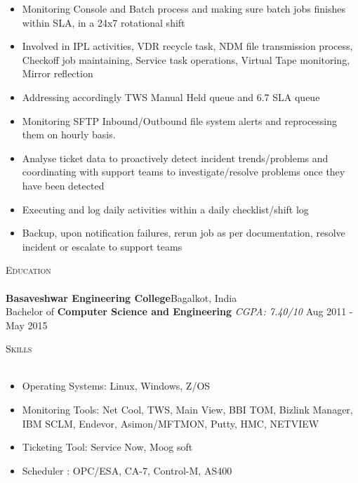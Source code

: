 \documentclass[a4paper]{article}
\newcommand{\lineunder} {
    \vspace*{-8pt} \\
    \hspace*{-18pt} \hrulefill \\
}
\newcommand{\header} [1] {
    {\hspace*{-18pt}\vspace*{6pt} \textsc{#1}}
    \vspace*{-6pt} \lineunder
}
\begin{document}
\justify
\begin{itemize} \itemsep 1pt
          \item Monitoring Console and Batch process and making sure batch jobs finishes within SLA, in a 24x7 rotational shift
	\item Involved in  IPL activities, VDR recycle task, NDM file transmission process, Checkoff job maintaining, Service task operations, Virtual Tape monitoring, Mirror reflection
	\item Addressing accordingly TWS Manual Held queue and 6.7 SLA queue
           \item Monitoring SFTP Inbound/Outbound file system alerts and reprocessing them on hourly basis.
	\item Analyse ticket data to proactively detect incident trends/problems and coordinating with support teams to investigate/resolve problems once they have been detected
	\item Executing and log daily activities within a daily checklist/shift log
           \item Backup, upon notification failures, rerun job as per documentation, resolve incident or escalate to support teams
\end{itemize}

\vspace{2mm}


{\color{blue}\header{Education}}
\vspace{1mm}
\textbf{Basaveshwar Engineering College}\hfill Bagalkot, India\\
Bachelor of \textbf{Computer Science and Engineering} \textit{CGPA: 7.40/10} \hfill Aug 2011 - May 2015\\
\vspace{2mm}


{\color{blue}\header{Skills}}
\vspace{1mm}
\justify
\begin{itemize} \itemsep 1pt
	\item Operating Systems: Linux, Windows, Z/OS \\
	\item Monitoring Tools: Net Cool, TWS, Main View, BBI TOM, Bizlink Manager, IBM SCLM, Endevor, Asimon/MFTMON, Putty, HMC, NETVIEW \\
           \item Ticketing Tool: Service Now, Moog soft \\
           \item Scheduler : OPC/ESA, CA-7, Control-M, AS400
\end{itemize}
\vspace{2mm}
\end{document}
